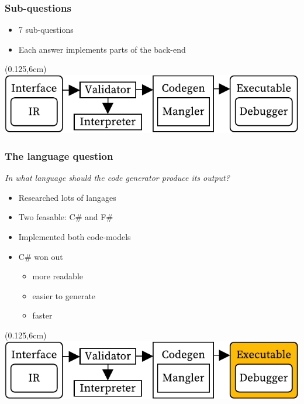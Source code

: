 \documentclass[xetex,serif,aspectratio=169]{beamer}
\begin{document}
\begin{frame}
\end{frame}\begin{frame}[t]\frametitle{Sub-questions}
\begin{itemize}
    \item 7 sub-questions
    \item Each answer implements parts of the back-end
\end{itemize}
\begin{textblock*}{0.75\paperwidth}(0.125\paperwidth,6cm)\includegraphics[width=0.75\paperwidth]{overview}\end{textblock*}

\end{frame}\begin{frame}[t]\frametitle{The language question}
\textit{In what language should the code generator produce its output?}
\begin{itemize}
    \item Researched lots of langages
    \item Two feasable: C\# and F\#
    \item Implemented both code-models
    \item C\# won out
    \begin{itemize}
        \item more readable
        \item easier to generate
        \item faster
    \end{itemize}
\end{itemize}
\begin{textblock*}{0.75\paperwidth}(0.125\paperwidth,6cm)\includegraphics[width=0.75\paperwidth]{overview_language}\end{textblock*}


\end{frame}
\end{document}
